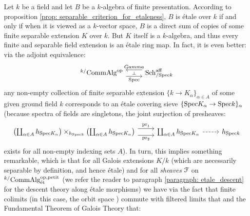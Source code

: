             \begin{corollary} \label{coro: finite_separable_extensions_are_etale}
                Let $k$ be a field and let $B$ be a $k$-algebra of finite presentation. According to proposition \ref{prop: separable_criterion_for_etaleness}, $B$ is \'etale over $k$ if and only if when it is viewed as a $k$-vector space, $B$ is a direct sum of copies of some finite separable extension $K$ over $k$. But $K$ itself is a $k$-algebra, and thus every finite and separable field extension is an \'etale ring map. In fact, it is even better: via the adjoint equivalence:
                    $$
                        \begin{tikzcd}
                        	{{}^{k/}\Comm\Alg^{\op}} & {\Sch^{\aff}_{/\Spec k}}
                        	\arrow[""{name=0, anchor=center, inner sep=0}, "\Spec"', shift right=2, from=1-1, to=1-2]
                        	\arrow[""{name=1, anchor=center, inner sep=0}, "Gamma"', shift right=2, from=1-2, to=1-1]
                        	\arrow["\dashv"{anchor=center, rotate=-90}, draw=none, from=1, to=0]
                        \end{tikzcd}
                    $$
                any non-empty collection of finite separable extension $\{k \to K_{\alpha}\}_{\alpha \in A}$ of some given ground field $k$ corresponds to an \'etale covering sieve $\{\mathrm{Spec} K_{\alpha} \to \mathrm{Spec} k\}_{\alpha}$ (because spectra of fields are singletons, the joint surjection of presheaves:
                    $$
                        \begin{tikzcd}
                        	{\left(\coprod_{\alpha \in A} h_{\Spec K_{\alpha}}\right) \x_{h_{\Spec k}} \left(\coprod_{\alpha \in A} h_{\Spec K_{\alpha}}\right)} & {\coprod_{\alpha \in A} h_{\Spec K_{\alpha}}} & {h_{\Spec k}}
                        	\arrow["{\pr_2}"', shift right=2, from=1-1, to=1-2]
                        	\arrow["{\pr_1}", shift left=2, from=1-1, to=1-2]
                        	\arrow[dashed, from=1-2, to=1-3]
                        \end{tikzcd}
                    $$
                exists for all non-empty indexing sets $A$). In turn, this implies something remarkable, which is that for all Galois extensions $K/k$ (which are necessarily separable by definition, and hence \'etale) and for all \textit{sheaves} $\mathcal{F}$ on ${}^{k/}\mathrm{Comm}\mathrm{Alg}^{\mathrm{op}, \mathrm{petit}}_{\mathrm{\acute{e}t}}$ (we refer the reader to paragraph \ref{paragraph: etale_descent} for the descent theory along \'etale morphisms) we have via the fact that finite colimits (in this case, the orbit space ) commute with filtered limits that and the Fundamental Theorem of Galois Theory that:

\end{corollary}
